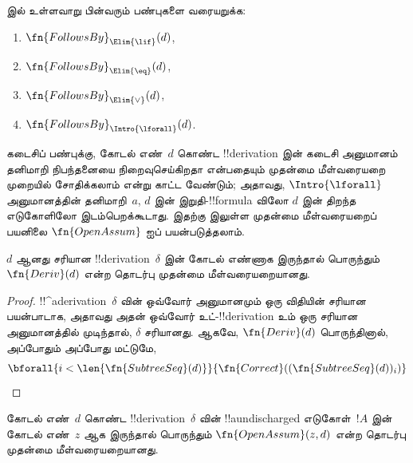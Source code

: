 \documentclass[../../../include/open-logic-section]{subfiles}
\begin{document}
\begin{prob}
   இல் உள்ளவாறு பின்வரும் பண்புகளை
  வரையறுக்க:
  \begin{enumerate}
  \item $\fn{FollowsBy}_{\Elim{\lif}}(d)$,
  \item $\fn{FollowsBy}_{\Elim{\eq}}(d)$,
  \item $\fn{FollowsBy}_{\Elim{\lor}}(d)$,
  \item $\fn{FollowsBy}_{\Intro{\lforall}}(d)$.
  \end{enumerate}
  கடைசிப் பண்புக்கு, கோடல் எண்~$d$ கொண்ட !!{derivation} இன் கடைசி
  அனுமானம் தனிமாறி நிபந்தனையை நிறைவுசெய்கிறதா என்பதையும் முதன்மை
  மீள்வரையறை முறையில் சோதிக்கலாம் என்று காட்ட வேண்டும்; அதாவது,
  $\Intro{\lforall}$ அனுமானத்தின் தனிமாறி~$a$, $d$ இன்
  இறுதி-!!{formula} விலோ $d$ இன் திறந்த எடுகோளிலோ இடம்பெறக்கூடாது.
  இதற்கு  இலுள்ள முதன்மை
  மீள்வரையறைப் பயனிலை $\fn{OpenAssum}$ ஐப் பயன்படுத்தலாம்.
\end{prob}

\begin{prop}
  $d$ ஆனது சரியான !!{derivation}~$\delta$ இன் கோடல் எண்ணாக இருந்தால்
  பொருந்தும் $\fn{Deriv}(d)$ என்ற தொடர்பு முதன்மை மீள்வரையறையானது.
\end{prop}

\begin{proof}
  !!^a{derivation}~$\delta$ வின் ஒவ்வோர் அனுமானமும் ஒரு விதியின் சரியான
  பயன்பாடாக, அதாவது அதன் ஒவ்வோர் உட்-!!{derivation} உம் ஒரு சரியான
  அனுமானத்தில் முடிந்தால், $\delta$ சரியானது. ஆகவே,
  $\fn{Deriv}(d)$ பொருந்தினால், அப்போதும் அப்போது மட்டுமே,
  \[
  \bforall{i<\len{\fn{SubtreeSeq}(d)}}{\fn{Correct}((\fn{SubtreeSeq}(d))_i)}
  \]
\end{proof}

\begin{prop}
   கோடல் எண்~$d$ கொண்ட
  !!{derivation}~$\delta$ வின் !!a{undischarged} எடுகோள்~$!A$ இன்
  கோடல் எண்~$z$ ஆக இருந்தால் பொருந்தும் $\fn{OpenAssum}(z, d)$ என்ற
  தொடர்பு முதன்மை மீள்வரையறையானது.
\end{prop}
\end{document}
